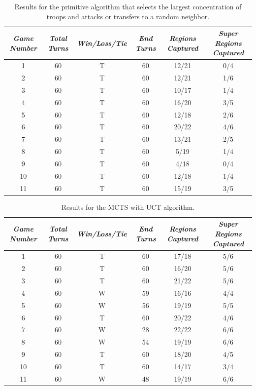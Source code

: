 \documentclass[a4paper,11pt]{article}
\begin{document}
%
\begin{table}[!htbp]
  \scriptsize
  \centering
  \begin{tabular}{|c|c|c|c|c|c|}
    \hline
    \emph{Game Number} & \emph{Total Turns} & \emph{Win/Loss/Tie} & \emph{End Turns} & \emph{Regions Captured} & \emph{Super Regions Captured} \\
    \hline
    1   & 60 & T & 60 & 12/21 & 0/4 \\
    2   & 60 & T & 60 & 12/21 & 1/6 \\
    3   & 60 & T & 60 & 10/17 & 1/4 \\
    4   & 60 & T & 60 & 16/20 & 3/5 \\
    5   & 60 & T & 60 & 12/18 & 2/6 \\
    6   & 60 & T & 60 & 20/22 & 4/6 \\
    7   & 60 & T & 60 & 13/21 & 2/5 \\
    8   & 60 & T & 60 & 5/19 & 1/4 \\
    9   & 60 & T & 60 & 4/18 & 0/4 \\
    10  & 60 & T & 60 & 12/18 & 1/4 \\
    11  & 60 & T & 60 & 15/19 & 3/5 \\
    \hline
  \end{tabular}
  \caption{Results for the primitive algorithm that selects the largest concentration of troops and attacks or transfers to a random neighbor.}
  \label{tab:primitive_results}
\end{table}
%

%
\begin{table}[!htbp]
  \scriptsize
  \centering
  \begin{tabular}{|c|c|c|c|c|c|}
    \hline
    \emph{Game Number} & \emph{Total Turns} & \emph{Win/Loss/Tie} & \emph{End Turns} & \emph{Regions Captured} & \emph{Super Regions Captured} \\
    \hline
    1   & 60 & T & 60 & 17/18 & 5/6 \\
    2   & 60 & T & 60 & 16/20 & 5/6 \\
    3   & 60 & T & 60 & 21/22 & 5/6 \\
    4   & 60 & W & 59 & 16/16 & 4/4 \\
    5   & 60 & W & 56 & 19/19 & 5/5 \\
    6   & 60 & T & 60 & 20/22 & 4/6 \\
    7   & 60 & W & 28 & 22/22 & 6/6 \\
    8   & 60 & W & 54 & 19/19 & 6/6 \\
    9   & 60 & T & 60 & 18/20 & 4/5 \\
    10  & 60 & T & 60 & 14/17 & 3/4 \\
    11  & 60 & W & 48 & 19/19 & 6/6 \\
    \hline
  \end{tabular}
  \caption{Results for the MCTS with UCT algorithm.}
  \label{tab:uct_results}
\end{table}
%
\end{document}
